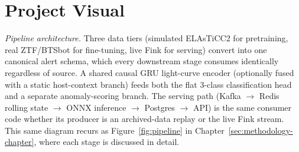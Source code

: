 \chapter*{Project Visual}

\begin{center}
\resizebox{\linewidth}{!}{}
\end{center}

\bigskip
\noindent\textit{Pipeline architecture.} Three data tiers (simulated
ELAsTiCC2 for pretraining, real ZTF/BTSbot for fine-tuning, live Fink for
serving) convert into one canonical alert schema, which every downstream
stage consumes identically regardless of source. A shared causal GRU
light-curve encoder (optionally fused with a static host-context branch)
feeds both the flat 3-class classification head and a separate
anomaly-scoring branch. The serving path (Kafka $\to$ Redis rolling state
$\to$ ONNX inference $\to$ Postgres $\to$ API) is the same consumer code
whether its producer is an archived-data replay or the live Fink stream.
This same diagram recurs as Figure~\ref{fig:pipeline} in
Chapter~\ref{sec:methodology-chapter}, where each stage is discussed in
detail.
